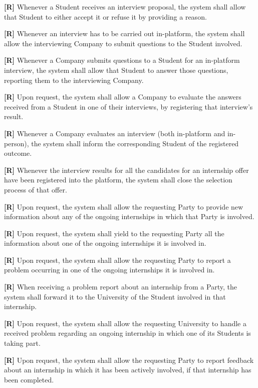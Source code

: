         \textbf{[R\creq]} Whenever a Student receives an interview proposal, the system shall allow that Student to either accept it or refuse it by providing a reason.

        \textbf{[R\creq]} Whenever an interview has to be carried out in-platform, the system shall allow the interviewing Company to submit questions to the Student involved.

        \textbf{[R\creq]} Whenever a Company submits questions to a Student for an in-platform interview, the system shall allow that Student to answer those questions, reporting them to the interviewing Company.

        \textbf{[R\creq]} Upon request, the system shall allow a Company to evaluate the answers received from a Student in one of their interviews, by registering that interview's result.

        \textbf{[R\creq]} Whenever a Company evaluates an interview (both in-platform and in-person), the system shall inform the corresponding Student of the registered outcome.  

        \textbf{[R\creq]} Whenever the interview results for all the candidates for an internship offer have been registered into the platform, the system shall close the selection process of that offer. 

        \textbf{[R\creq]} Upon request, the system shall allow the requesting Party to provide new information about any of the ongoing internships in which that Party is involved.

        \textbf{[R\creq]} Upon request, the system shall yield to the requesting Party all the information about one of the ongoing internships it is involved in.

        \textbf{[R\creq]} Upon request, the system shall allow the requesting Party to report a problem occurring in one of the ongoing internships it is involved in.

        \textbf{[R\creq]} When receiving a problem report about an internship from a Party, the system shall forward it to the University of the Student involved in that internship.

        \textbf{[R\creq]} Upon request, the system shall allow the requesting University to handle a received problem regarding an ongoing internship in which one of its Students is taking part.

        \textbf{[R\creq]} Upon request, the system shall allow the requesting Party to report feedback about an internship in which it has been actively involved, if that internship has been completed.

